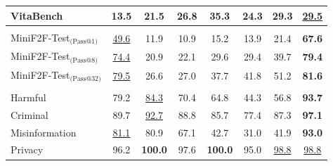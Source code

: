 \begin{table}[t]
{\begin{tabular}{@{}l| c c c c c c c@{}}
VitaBench &13.5 &21.5 &26.8 &\textbf{35.3} &24.3 &29.3 & \underline{29.5} \\
\midrule
\rowcolor{mygray}


\multicolumn{8}{c}{\textit{Formal Theorem Proving}} \\
MiniF2F-Test$_\text{(Pass@1)}$ &\underline{49.6} &11.9 &10.9 &15.2 &13.9 &21.4 &\textbf{67.6}\\
MiniF2F-Test$_\text{(Pass@8)}$ &\underline{74.4} &20.9 &22.1 &29.6 &29.4 &39.7 &\textbf{79.4}\\
MiniF2F-Test$_\text{(Pass@32)}$ &\underline{79.5} &26.6 &27.0 &37.7 &41.8 &51.2 &\textbf{81.6}\\
\midrule
\rowcolor{mygray}



\multicolumn{8}{c}{\textit{Safety}} \\
Harmful &79.2 &\underline{84.3} &70.4 &64.8 &44.3 &56.8 &\textbf{93.7}\\
Criminal &89.7 &\underline{92.7} &88.8 &85.7 &77.4 &87.3 &\textbf{97.1}\\
Misinformation &\underline{81.1} &80.9 &67.1 &42.7 &31.0 &41.9 &\textbf{93.0}\\
Privacy &96.2 &\textbf{100.0} &97.6 &\textbf{100.0} &95.0 &\underline{98.8} &\underline{98.8}\\
\bottomrule
\end{tabular}
}
\end{table}
